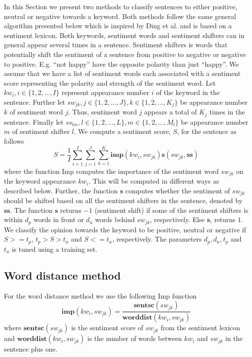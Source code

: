 \documentclass[11pt]{article}
\begin{document}
In this Section we present two methods to classify sentences to either positive, neutral or negative towards a keyword. Both methods follow the same general algorithm presented below which is inspired by Ding et al.  and is based on a sentiment lexicon. Both keywords, sentiment words and sentiment shifters can in general appear several times in a sentence. Sentiment shifters is words that potentially shift the sentiment of a sentence from positive to negative or negative to positive. E.g. ``not happy'' have the opposite polarity than just ``happy''. We assume that we have a list of sentiment words each associated with a sentiment score representing the polarity and strength of the sentiment word. Let $kw_i, i \in \{1,2,\ldots,I\}$ represent appearance number $i$ of the keyword in the sentence. Further let $sw_{jk}, j \in \{1,2,\ldots,J\}, k \in\{1,2,\ldots,K_j\}$ be appearance number $k$ of sentiment word $j$. Thus, sentiment word $j$ appears a total of $K_j$ times in the sentence. Finally let $ss_{lm}, l \in \{1,2,\ldots,L\}, m \in\{1,2,\ldots,M_l\}$ be appearance number $m$ of sentiment shifter $l$. We 
compute a sentiment score, $S$, for the sentence as follows
\begin{equation}
  \label{eq:1}
  S = \frac{1}{I}\sum_{i=1}^{I} \sum_{j=1}^{J} \sum_{k=1}^{K}\mathbf{imp}(kw_i, sw_{jk})\mathbf{s}(sw_{jk}, \mathbf{ss})    
\end{equation}
where the function Imp computes the importance of the sentiment word $sw_{jk}$ on the keyword appearance $kw_i$. This will be computed in different ways as described below. Further, the function $\mathbf{s}$ computes whether the sentiment of $sw_{jk}$ should be shifted based on all the sentiment shifters in the sentence, denoted by $\mathbf{ss}$. The function $\mathbf{s}$ returns $-1$ (sentiment shift) if some of the sentiment shifters is within $d_{p}$ words in front or $d_{n}$ words behind $sw_{jk}$, respectively. Else $\mathbf{s}$, returns $1$. We classify the opinion towards the keyword to be positive, neutral or negative if $S >= t_p$,  $t_p > S > t_n$ and  $S <= t_n$, respectively. The parameters $d_p, d_n, t_p$ and $t_n$ is tuned using a training set.

\subsection{Word distance method}
\label{sec:wd}

For the word distance method we use the following Imp function
\begin{equation}
  \label{eq:2}
  \mathbf{imp}(kw_i, sw_{jk}) = \frac{\mathbf{sentsc}(sw_{jk})}{\mathbf{worddist}(kw_i, sw_{jk})}
\end{equation}
where $\mathbf{sentsc}(sw_{jk})$ is the sentiment score of $sw_{jk}$ from the sentiment lexicon and $\mathbf{worddist}(kw_i, sw_{jk})$ is the number of words between $kw_i$ and $sw_{jk}$ in the sentence plus one.
\end{document}
